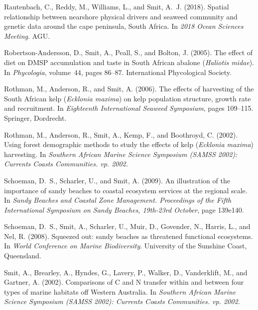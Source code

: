 \begin{thebibliography}{}
  Rautenbach, C., Reddy, M., Williams, L., and Smit, A.~J. (2018).
  \newblock Spatial relationship between nearshore physical drivers and seaweed
    community and genetic data around the cape peninsula, {S}outh {A}frica.
  \newblock In {\em 2018 Ocean Sciences Meeting}. AGU.
  
  Robertson-Andersson, D., Smit, A., Peall, S., and Bolton, J. (2005).
  \newblock The effect of diet on {DMSP} accumulation and taste in {S}outh
    {A}frican abalone (\emph{Haliotis midae}).
  \newblock In {\em Phycologia}, volume~44, pages 86--87. International
    Phycological Society.
  
  Rothman, M., Anderson, R., and Smit, A. (2006).
  \newblock The effects of harvesting of the {S}outh {A}frican kelp
    (\emph{Ecklonia maxima}) on kelp population structure, growth rate and
    recruitment.
  \newblock In {\em Eighteenth International Seaweed Symposium}, pages 109--115.
    Springer, Dordrecht.
  
  Rothman, M., Anderson, R., Smit, A., Kemp, F., and Boothroyd, C. (2002).
  \newblock Using forest demographic methods to study the effects of kelp
    (\emph{Ecklonia maxima}) harvesting.
  \newblock In {\em Southern African Marine Science Symposium (SAMSS 2002):
    Currents Coasts Communities. vp. 2002.}
  
  Schoeman, D.~S., Scharler, U., and Smit, A. (2009).
  \newblock An illustration of the importance of sandy beaches to coastal
    ecosystem services at the regional scale.
  \newblock In {\em Sandy Beaches and Coastal Zone Management. Proceedings of the
    Fifth International Symposium on Sandy Beaches, 19th-23rd October}, page
    139e140.
  
  Schoeman, D.~S., Smit, A., Scharler, U., Muir, D., Govender, N., Harris, L.,
    and Nel, R. (2008).
  \newblock Squeezed out: sandy beaches as threatened functional ecosystems.
  \newblock In {\em World Conference on Marine Biodiversity}. University of the
    Sunshine Coast, Queensland.
  
  Smit, A., Brearley, A., Hyndes, G., Lavery, P., Walker, D., Vanderklift, M.,
    and Gartner, A. (2002).
  \newblock Comparisons of {C} and {N} transfer within and between four types of
    marine habitats off {W}estern {A}ustralia.
  \newblock In {\em Southern African Marine Science Symposium (SAMSS 2002):
    Currents Coasts Communities. vp. 2002.}
  

\end{thebibliography}
